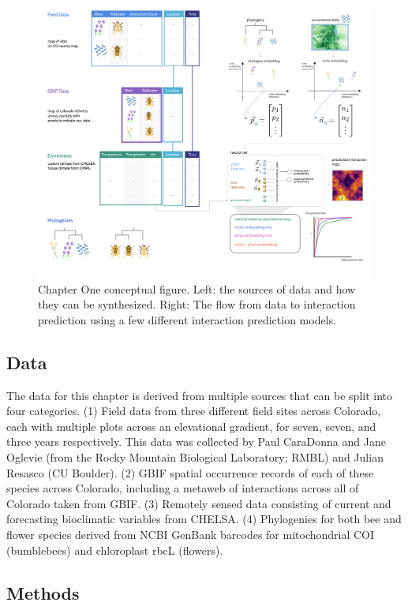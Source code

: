 \documentclass[10pt,oneside]{article}
\makeatletter
\def\maxwidth{\ifdim\Gin@nat@width>\linewidth\linewidth
\else\Gin@nat@width\fi}
\let\Oldincludegraphics\includegraphics
\renewcommand{\includegraphics}[1]{\Oldincludegraphics[width=\maxwidth]{#1}}
\makeatother
\begin{document}
\begin{figure}
\centering
\includegraphics{./figures/ch1.png}
\caption{Chapter One conceptual figure. Left: the sources of data and
how they can be synthesized. Right: The flow from data to interaction
prediction using a few different interaction prediction models.}
\end{figure}

\hypertarget{data}{%
\subsection{Data}\label{data}}

The data for this chapter is derived from multiple sources that can be
split into four categories. (1) Field data from three different field
sites across Colorado, each with multiple plots across an elevational
gradient, for seven, seven, and three years respectively. This data was
collected by Paul CaraDonna and Jane Oglevie (from the Rocky Mountain
Biological Laboratory; RMBL) and Julian Resasco (CU Boulder). (2) GBIF
spatial occurrence records of each of these species across Colorado,
including a metaweb of interactions across all of Colorado taken from
GBIF. (3) Remotely sensed data consisting of current and forecasting
bioclimatic variables from CHELSA. (4) Phylogenies for both bee and
flower species derived from NCBI GenBank barcodes for mitochondrial COI
(bumblebees) and chloroplast rbcL (flowers).

\hypertarget{methods}{%
\subsection{Methods}\label{methods}}
\end{document}

